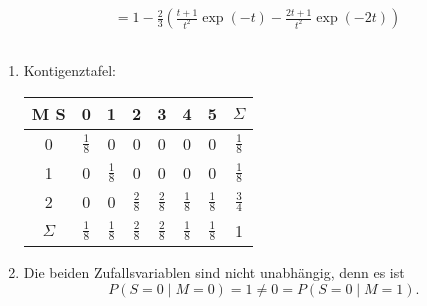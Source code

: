 \documentclass[a4paper]{article}
\begin{document}
\begin{enumerate}
\begin{align*}
        &= 1 - \frac{2}{3} \left( \frac{t+1}{t^2} \exp(-t) - \frac{2t + 1}{t^2} \exp(-2t) \right)
    \end{align*}
\end{enumerate}

\subsection{}
\begin{enumerate}
    \item Kontigenztafel:
    \begin{center}
        \begin{tabular}{|c|c|c|c|c|c|c|c|}
            \hline
            M  S & 0 & 1 & 2 & 3 & 4 & 5 & $\Sigma$ \\ \hline
            0 & $\frac{1}{8}$ & 0 & 0 & 0 & 0 & 0 & $\frac{1}{8}$ \\ \hline
            1 & 0 & $\frac{1}{8}$ & 0 & 0 & 0 & 0 & $\frac{1}{8}$ \\ \hline
            2 & 0 & 0 & $\frac{2}{8}$ & $\frac{2}{8}$ & $\frac{1}{8}$ & $\frac{1}{8}$ & $\frac{3}{4}$\\ \hline
            $\Sigma$ & $\frac{1}{8}$ & $\frac{1}{8}$ & $\frac{2}{8}$ & $\frac{2}{8}$ & $\frac{1}{8}$ & $\frac{1}{8}$ &  1 \\ \hline
        \end{tabular}
    \end{center}
    \item Die beiden Zufallsvariablen sind nicht unabhängig, denn es ist 
    \begin{equation*}
        P(S = 0 \mid M = 0) = 1 \neq 0 = P(S = 0 \mid M = 1) \text{.}
    \end{equation*}
\end{enumerate}
\end{document}
